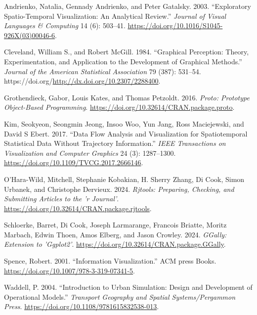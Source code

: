 \hypertarget{refs}{}
\begin{CSLReferences}{1}{0}
\leavevmode{}%
Andrienko, Natalia, Gennady Andrienko, and Peter Gatalsky. 2003. {``Exploratory Spatio-Temporal Visualization: An Analytical Review.''} \emph{Journal of Visual Languages \& Computing} 14 (6): 503--41. \url{https://doi.org/10.1016/S1045-926X(03)00046-6}.

\leavevmode{}%
Cleveland, William S., and Robert McGill. 1984. {``Graphical Perception: Theory, Experimentation, and Application to the Development of Graphical Methods.''} \emph{Journal of the American Statistical Association} 79 (387): 531--54. https://doi.org/\url{http://dx.doi.org/10.2307/2288400}.

\leavevmode{}%
Grothendieck, Gabor, Louis Kates, and Thomas Petzoldt. 2016. \emph{Proto: Prototype Object-Based Programming}. \url{https://doi.org/10.32614/CRAN.package.proto}.

\leavevmode{}%
Kim, Seokyeon, Seongmin Jeong, Insoo Woo, Yun Jang, Ross Maciejewski, and David S Ebert. 2017. {``Data Flow Analysis and Visualization for Spatiotemporal Statistical Data Without Trajectory Information.''} \emph{IEEE Transactions on Visualization and Computer Graphics} 24 (3): 1287--1300. \url{https://doi.org/10.1109/TVCG.2017.2666146}.

\leavevmode{}%
O'Hara-Wild, Mitchell, Stephanie Kobakian, H. Sherry Zhang, Di Cook, Simon Urbanek, and Christophe Dervieux. 2024. \emph{Rjtools: Preparing, Checking, and Submitting Articles to the 'r Journal'}. \url{https://doi.org/10.32614/CRAN.package.rjtools}.

\leavevmode{}%
Schloerke, Barret, Di Cook, Joseph Larmarange, Francois Briatte, Moritz Marbach, Edwin Thoen, Amos Elberg, and Jason Crowley. 2024. \emph{GGally: Extension to 'Ggplot2'}. \url{https://doi.org/10.32614/CRAN.package.GGally}.

\leavevmode{}%
Spence, Robert. 2001. {``Information Visualization.''} ACM press Books. \url{https://doi.org/10.1007/978-3-319-07341-5}.

\leavevmode{}%
Waddell, P. 2004. {``Introduction to Urban Simulation: Design and Development of Operational Models.''} \emph{Transport Geography and Spatial Systems/Pergammon Press}. \url{https://doi.org/10.1108/9781615832538-013}.


\end{CSLReferences}
